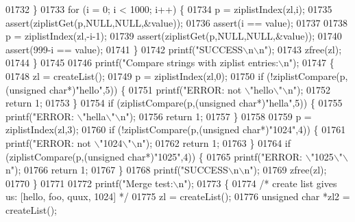 \begin{DoxyCode}
{{{{{{{{{{{{{{{{{{{{{{{{{{{{{01732         \}
01733         \textcolor{keywordflow}{for} (i = 0; i < 1000; i++) \{
01734             p = ziplistIndex(zl,i);
01735             assert(ziplistGet(p,NULL,NULL,&value));
01736             assert(i == value);
01737 
01738             p = ziplistIndex(zl,-i-1);
01739             assert(ziplistGet(p,NULL,NULL,&value));
01740             assert(999-i == value);
01741         \}
01742         printf(\textcolor{stringliteral}{"SUCCESS\(\backslash\)n\(\backslash\)n"});
01743         zfree(zl);
01744     \}
01745 
01746     printf(\textcolor{stringliteral}{"Compare strings with ziplist entries:\(\backslash\)n"});
01747     \{
01748         zl = createList();
01749         p = ziplistIndex(zl,0);
01750         \textcolor{keywordflow}{if} (!ziplistCompare(p,(\textcolor{keywordtype}{unsigned} \textcolor{keywordtype}{char}*)\textcolor{stringliteral}{"hello"},5)) \{
01751             printf(\textcolor{stringliteral}{"ERROR: not \(\backslash\)"hello\(\backslash\)"\(\backslash\)n"});
01752             \textcolor{keywordflow}{return} 1;
01753         \}
01754         \textcolor{keywordflow}{if} (ziplistCompare(p,(\textcolor{keywordtype}{unsigned} \textcolor{keywordtype}{char}*)\textcolor{stringliteral}{"hella"},5)) \{
01755             printf(\textcolor{stringliteral}{"ERROR: \(\backslash\)"hella\(\backslash\)"\(\backslash\)n"});
01756             \textcolor{keywordflow}{return} 1;
01757         \}
01758 
01759         p = ziplistIndex(zl,3);
01760         \textcolor{keywordflow}{if} (!ziplistCompare(p,(\textcolor{keywordtype}{unsigned} \textcolor{keywordtype}{char}*)\textcolor{stringliteral}{"1024"},4)) \{
01761             printf(\textcolor{stringliteral}{"ERROR: not \(\backslash\)"1024\(\backslash\)"\(\backslash\)n"});
01762             \textcolor{keywordflow}{return} 1;
01763         \}
01764         \textcolor{keywordflow}{if} (ziplistCompare(p,(\textcolor{keywordtype}{unsigned} \textcolor{keywordtype}{char}*)\textcolor{stringliteral}{"1025"},4)) \{
01765             printf(\textcolor{stringliteral}{"ERROR: \(\backslash\)"1025\(\backslash\)"\(\backslash\)n"});
01766             \textcolor{keywordflow}{return} 1;
01767         \}
01768         printf(\textcolor{stringliteral}{"SUCCESS\(\backslash\)n\(\backslash\)n"});
01769         zfree(zl);
01770     \}
01771 
01772     printf(\textcolor{stringliteral}{"Merge test:\(\backslash\)n"});
01773     \{
01774         \textcolor{comment}{/* create list gives us: [hello, foo, quux, 1024] */}
01775         zl = createList();
01776         \textcolor{keywordtype}{unsigned} \textcolor{keywordtype}{char} *zl2 = createList();
}}}}}}}}}}}}}}}}}}}}}}}}}}}}}
\end{DoxyCode}
